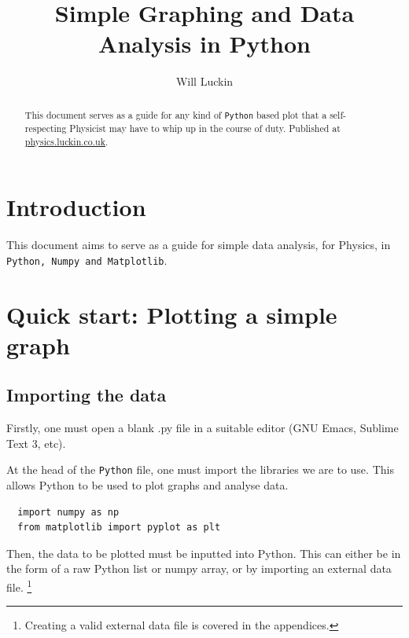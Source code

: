 \documentclass{article}
\author{Will Luckin}
\title{Simple Graphing and Data Analysis in Python}
\begin{document}


\maketitle

\begin{abstract}
  This document serves as a guide for any kind of \texttt{Python}
  based plot that a self-respecting Physicist may have to whip up in
  the course of duty.
  Published at \url{physics.luckin.co.uk}.
\end{abstract}

\tableofcontents
\newpage

\section{Introduction}
This document aims to serve as a guide for simple data analysis, for
Physics, in \texttt{Python, Numpy and Matplotlib}.  

\section{Quick start: Plotting a simple graph}
\subsection{Importing the data}
Firstly, one must open a blank .py file in a suitable editor (GNU
Emacs, Sublime Text 3, etc).

At the head of the \texttt{Python} file, one must import the libraries
we are to use. This allows Python to be used to plot graphs and
analyse data.

\begin{lstlisting}
  import numpy as np
  from matplotlib import pyplot as plt
\end{lstlisting}

Then, the data to be plotted must be inputted into Python. This can
either be in the form of a raw Python list or numpy array, or by
importing an external data file. \footnote{Creating a valid external
  data file is covered in the appendices.}
\end{document}
